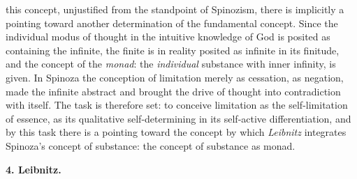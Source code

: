 this concept, unjustified from the standpoint of Spinozism, there is
implicitly a pointing toward another determination of the fundamental
concept. Since the individual modus of thought in the intuitive
knowledge of God is posited as containing the infinite, the finite is
in reality posited as infinite in its finitude, and the concept of the
\emph{monad}: the \emph{individual} substance with inner infinity, is
given. In Spinoza the conception of limitation merely as cessation, as
negation, made the infinite abstract and brought the drive of thought
into contradiction with itself. The task is therefore set: to conceive
limitation as the self-limitation of essence, as its qualitative
self-determining in its self-active differentiation, and by this task
there is a pointing toward the concept by which \emph{Leibnitz}
integrates Spinoza's concept of substance: the concept of substance as
monad.

\divrule

\begin{center}
  \textbf{4. Leibnitz.}
\end{center}

